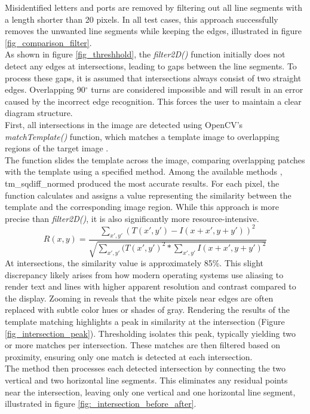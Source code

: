 Misidentified letters and ports are removed by filtering out all line segments with a length shorter than 20 pixels. In all test cases, this approach successfully removes the unwanted line segments while keeping the edges, illustrated in figure \ref{fig_comparison_filter}.\\
As shown in figure \ref{fig_threshhold}, the \textit{filter2D()} function initially does not detect any edges at intersections, leading to gaps between the line segments. To process these gaps, it is assumed that intersections always consist of two straight edges. Overlapping 90$^{\circ}$ turns are considered impossible and will result in an error caused by the incorrect edge recognition. This forces the user to maintain a clear diagram structure.\\
First, all intersections in the image are detected using OpenCV's \textit{matchTemplate()} function, which matches a template image to overlapping regions of the target image \cite{web_matchTemplate}.\\
The function slides the template across the image, comparing overlapping patches with the template using a specified method. Among the available methods \cite{comparison_methods}, tm\_sqdiff\_normed produced the most accurate results. For each pixel, the function calculates and assigns a value representing the similarity between the template and the corresponding image region. While this approach is more precise than \textit{filter2D()}, it is also significantly more resource-intensive.
\begin{equation}
\label{tm_sqdiff_normed}
    R(x,y) = \frac{\sum_{x', y'}{(T(x', y') - I(x + x', y + y'))^2}}{\sqrt{\sum_{x', y'}{(T(x', y')^2 * \sum_{x', y'}{I(x + x', y + y')^2}}}}
\end{equation}
At intersections, the similarity value is approximately 85\%. This slight discrepancy likely arises from how modern operating systems use aliasing to render text and lines with higher apparent resolution and contrast compared to the display. Zooming in reveals that the white pixels near edges are often replaced with subtle color hues or shades of gray. Rendering the results of the template matching highlights a peak in similarity at the intersection (Figure \ref{fig_intersection_peak}). Thresholding isolates this peak, typically yielding two or more matches per intersection. These matches are then filtered based on proximity, ensuring only one match is detected at each intersection.\\
The method then processes each detected intersection by connecting the two vertical and two horizontal line segments. This eliminates any residual points near the intersection, leaving only one vertical and one horizontal line segment, illustrated in figure \ref{fig:_intersection_before_after}.\\
